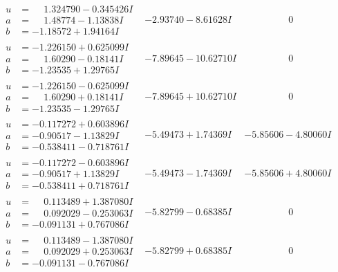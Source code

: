 \documentclass[1p]{elsarticle_modified}
\theoremstyle{definition}
\begin{document}
$$\begin{array}{c|c|c}
\begin{aligned}
u &= \phantom{-}1.324790 - 0.345426 I \\
a &= \phantom{-}1.48774 - 1.13838 I \\
b &= -1.18572 + 1.94164 I\end{aligned}
 & -2.93740 - 8.61628 I & \phantom{-0.000000 } 0 \\ \hline\begin{aligned}
u &= -1.226150 + 0.625099 I \\
a &= \phantom{-}1.60290 - 0.18141 I \\
b &= -1.23535 + 1.29765 I\end{aligned}
 & -7.89645 - 10.62710 I & \phantom{-0.000000 } 0 \\ \hline\begin{aligned}
u &= -1.226150 - 0.625099 I \\
a &= \phantom{-}1.60290 + 0.18141 I \\
b &= -1.23535 - 1.29765 I\end{aligned}
 & -7.89645 + 10.62710 I & \phantom{-0.000000 } 0 \\ \hline\begin{aligned}
u &= -0.117272 + 0.603896 I \\
a &= -0.90517 - 1.13829 I \\
b &= -0.538411 - 0.718761 I\end{aligned}
 & -5.49473 + 1.74369 I & -5.85606 - 4.80060 I \\ \hline\begin{aligned}
u &= -0.117272 - 0.603896 I \\
a &= -0.90517 + 1.13829 I \\
b &= -0.538411 + 0.718761 I\end{aligned}
 & -5.49473 - 1.74369 I & -5.85606 + 4.80060 I \\ \hline\begin{aligned}
u &= \phantom{-}0.113489 + 1.387080 I \\
a &= \phantom{-}0.092029 - 0.253063 I \\
b &= -0.091131 + 0.767086 I\end{aligned}
 & -5.82799 - 0.68385 I & \phantom{-0.000000 } 0 \\ \hline\begin{aligned}
u &= \phantom{-}0.113489 - 1.387080 I \\
a &= \phantom{-}0.092029 + 0.253063 I \\
b &= -0.091131 - 0.767086 I\end{aligned}
 & -5.82799 + 0.68385 I & \phantom{-0.000000 } 0 \\ \hline\begin{aligned}

\end{aligned}
\end{array}$$
\end{document}
